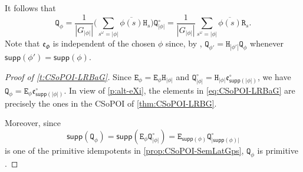 \documentclass[11pt, oneside, reqno]{amsart}
\theoremstyle{definition}
\numberwithin{equation}{section}
\def \ol{\overline}
\def \ee{{\mathfrak{e}}}
\def \supp{\mathsf{supp}}
\newcommand{\B}[1]{\mathtt{#1}} 			%
\newcommand{\abs}[1]{|{#1}|} 				%
\begin{document}
It follows that
\begin{equation}\label{eq:LRBaG-R-to-Q}
    \B{Q}_\phi =
    \dfrac{1}{|G_{\abs{\phi}}|} \Big( \sum_{s^\omega = \abs{\phi}} \ol{\phi(s)} \B{H}_s  \Big) \B{Q}^\circ_{\abs{\phi}} =
    \dfrac{1}{|G_{\abs{\phi}}|} \sum_{s^\omega = \abs{\phi}} \ol{\phi(s)} \B{R}_s.
\end{equation}
Note that $\ee_\Phi$ is independent of the chosen $\phi$ since, by ,
$\B{Q}_{\phi'} = \B{H}_{\abs{\phi'}} \B{Q}_{\phi}$
whenever $\supp(\phi') = \supp(\phi)$.

\begin{proof}[Proof of \cref{t:CSoPOI-LRBaG}]
    Since $\B{E}_\phi = \B{E}_\phi \B{H}_{\abs{\phi}}$ and $\B{Q}^\circ_{\abs{\phi}} = \B{H}_{\abs{\phi}} \ee^\circ_{\supp(\abs{\phi})}$, we have $\B{Q}_\phi = \B{E}_\phi \ee^\circ_{\supp(\abs{\phi})}$.
    In view of \cref{p:alt-eXi}, the elements in \cref{eq:CSoPOI-LRBaG} are precisely the ones in the CSoPOI of \cref{thm:CSoPOI-LRBG}.

    Moreover, since
    \[
        \supp(\B{Q}_\phi) = \supp(\B{E}_\phi \B{Q}^\circ_{\abs{\phi}}) = \B{E}_{\supp(\phi)} \B{Q}^\circ_{\abs{\supp(\phi)}}
    \]
    is one of the primitive idempotents in \cref{prop:CSoPOI-SemLatGps}, $\B{Q}_\phi$ is primitive \citep[Lemma~D.28]{am17}.
\end{proof}
\end{document}
